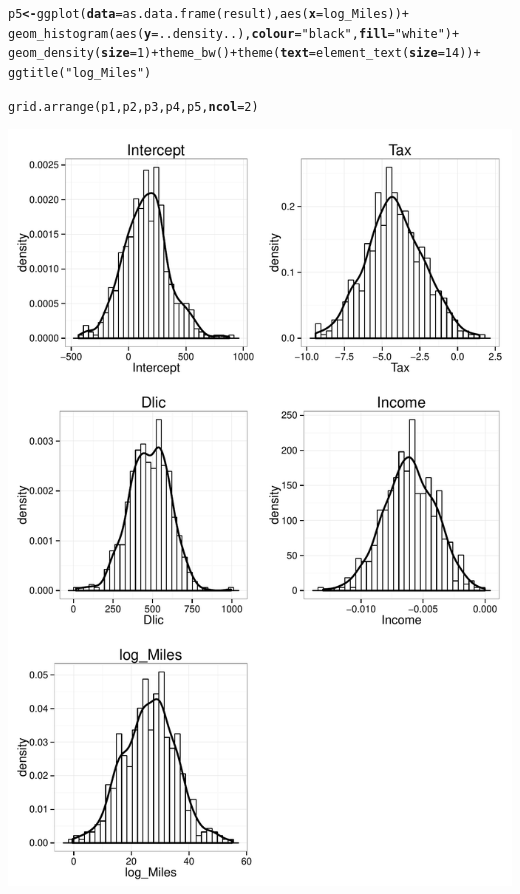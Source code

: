 \documentclass[12pt,oneside,a4paper]{article}\usepackage[]{graphicx}\usepackage[]{xcolor}
\makeatletter
\newcommand{\hlnum}[1]{\textcolor[rgb]{0,0,0}{#1}}%
\newcommand{\hlstr}[1]{\textcolor[rgb]{0,0,1}{#1}}%
\newcommand{\hlopt}[1]{\textcolor[rgb]{0,0,0}{#1}}%
\newcommand{\hlstd}[1]{\textcolor[rgb]{0,0,0}{#1}}%
\newcommand{\hlkwb}[1]{\textcolor[rgb]{0.498,0,0.333}{\textbf{#1}}}%
\newcommand{\hlkwc}[1]{\textcolor[rgb]{0.498,0,0.333}{\textbf{#1}}}%
\newcommand{\hlkwd}[1]{\textcolor[rgb]{0,0,0}{#1}}%
\newenvironment{kframe}{%
 \def\at@end@of@kframe{}%
 \ifinner\ifhmode%
  \def\at@end@of@kframe{\end{minipage}}%
  \begin{minipage}{\columnwidth}%
 \fi\fi%
 \def\FrameCommand##1{\hskip\@totalleftmargin \hskip-\fboxsep
 \colorbox{shadecolor}{##1}\hskip-\fboxsep
     \hskip-\linewidth \hskip-\@totalleftmargin \hskip\columnwidth}%
 \MakeFramed {\advance\hsize-\width
   \@totalleftmargin\z@ \linewidth\hsize
   \@setminipage}}%
 {\par\unskip\endMakeFramed%
 \at@end@of@kframe}
\newenvironment{knitrout}{}{} %
\makeatother
\begin{document}
\begin{knitrout}
\begin{kframe}
\begin{alltt}
\hlstd{p5} \hlkwb{<-} \hlkwd{ggplot}\hlstd{(}\hlkwc{data} \hlstd{=} \hlkwd{as.data.frame}\hlstd{(result),} \hlkwd{aes}\hlstd{(}\hlkwc{x} \hlstd{= log_Miles))} \hlopt{+}
    \hlkwd{geom_histogram}\hlstd{(}\hlkwd{aes}\hlstd{(}\hlkwc{y} \hlstd{= ..density..),} \hlkwc{colour} \hlstd{=} \hlstr{"black"}\hlstd{,} \hlkwc{fill} \hlstd{=} \hlstr{"white"}\hlstd{)} \hlopt{+}
    \hlkwd{geom_density}\hlstd{(}\hlkwc{size} \hlstd{=} \hlnum{1}\hlstd{)} \hlopt{+} \hlkwd{theme_bw}\hlstd{()} \hlopt{+} \hlkwd{theme}\hlstd{(}\hlkwc{text} \hlstd{=} \hlkwd{element_text}\hlstd{(}\hlkwc{size} \hlstd{=} \hlnum{14}\hlstd{))} \hlopt{+}
    \hlkwd{ggtitle}\hlstd{(}\hlstr{"log_Miles"}\hlstd{)}

\hlkwd{grid.arrange}\hlstd{(p1, p2, p3, p4, p5,} \hlkwc{ncol}\hlstd{=}\hlnum{2}\hlstd{)}
\end{alltt}
\end{kframe}

{\centering \includegraphics[width=.9\linewidth]{figure/p7102} 

}



\end{knitrout}
\end{document}
